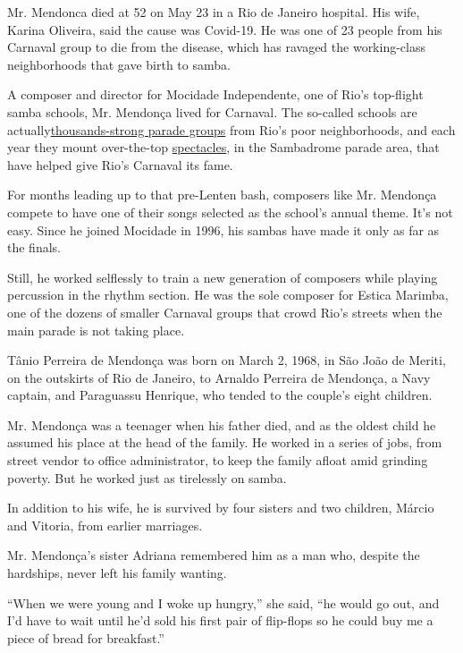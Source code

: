 Mr. Mendonca died at 52 on May 23 in a Rio de Janeiro hospital. His
wife, Karina Oliveira, said the cause was Covid-19. He was one of 23
people from his Carnaval group to die from the disease, which has
ravaged the working-class neighborhoods that gave birth to samba.

A composer and director for Mocidade Independente, one of Rio's
top-flight samba schools, Mr. Mendonça lived for Carnaval. The so-called
schools are
actually\href{https://www.theatlantic.com/photo/2020/02/brazil-carnival-2020-photos/607075/}{thousands-strong
parade groups} from Rio's poor neighborhoods, and each year they mount
over-the-top
\href{https://www.youtube.com/watch?v=9ztLCSwg6k0}{spectacles}, in the
Sambadrome parade area, that have helped give Rio's Carnaval its fame.

For months leading up to that pre-Lenten bash, composers like Mr.
Mendonça compete to have one of their songs selected as the school's
annual theme. It's not easy. Since he joined Mocidade in 1996, his
sambas have made it only as far as the finals.

Still, he worked selflessly to train a new generation of composers while
playing percussion in the rhythm section. He was the sole composer for
Estica Marimba, one of the dozens of smaller Carnaval groups that crowd
Rio's streets when the main parade is not taking place.

Tânio Perreira de Mendonça was born on March 2, 1968, in São João de
Meriti, on the outskirts of Rio de Janeiro, to Arnaldo Perreira de
Mendonça, a Navy captain, and Paraguassu Henrique, who tended to the
couple's eight children.

Mr. Mendonça was a teenager when his father died, and as the oldest
child he assumed his place at the head of the family. He worked in a
series of jobs, from street vendor to office administrator, to keep the
family afloat amid grinding poverty. But he worked just as tirelessly on
samba.

In addition to his wife, he is survived by four sisters and two
children, Márcio and Vitoria, from earlier marriages.

Mr. Mendonça's sister Adriana remembered him as a man who, despite the
hardships, never left his family wanting.

``When we were young and I woke up hungry,'' she said, ``he would go
out, and I'd have to wait until he'd sold his first pair of flip-flops
so he could buy me a piece of bread for breakfast.''

\href{https://www.nytimes.com/interactive/2020/obituaries/people-died-coronavirus-obituaries.html?action=click\&pgtype=Article\&state=default\&region=BELOW_MAIN_CONTENT\&context=covid_obits_promo}{}

